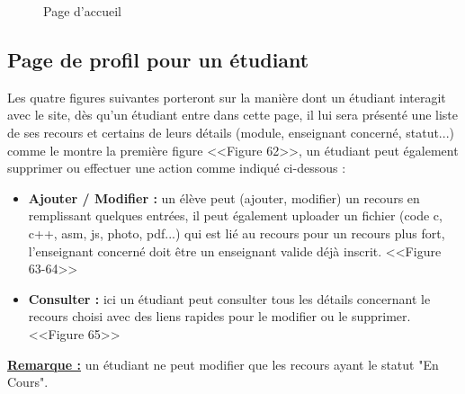 \documentclass[12pt]{report}
\begin{document}
\newpage

\begin{figure}[h]
\centering
\caption{Page d'accueil}
\end{figure}

\subsection{Page de profil pour un étudiant}

Les quatre figures suivantes porteront sur la manière dont un étudiant interagit avec le site, dès qu'un étudiant entre dans cette page, il lui sera présenté une liste de ses recours et certains de leurs détails (module, enseignant concerné, statut...) comme le montre la première figure <<Figure 62>>, un étudiant peut également supprimer ou effectuer une action comme indiqué ci-dessous :

\begin{itemize}
  \item \textbf{Ajouter / Modifier :} un élève peut (ajouter, modifier) un recours en remplissant quelques entrées, il peut également uploader un fichier (code c, c++, asm, js, photo, pdf...) qui est lié au recours pour un recours plus fort, l'enseignant concerné doit être un enseignant valide déjà inscrit. <<Figure 63-64>>
  \item \textbf{Consulter :} ici un étudiant peut consulter tous les détails concernant le recours choisi avec des liens rapides pour le modifier ou le supprimer. <<Figure 65>>
\end{itemize}
\textbf{\uline{Remarque :}} un étudiant ne peut modifier que les recours ayant le statut "En Cours".
\end{document}
